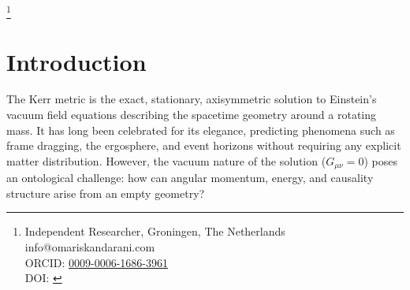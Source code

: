 \documentclass[twocolumn,aps,pre,floatfix,nofootinbib]{revtex4-2}
\begin{document}
    \title{\papertitle}
    \author{Omar Iskandarani}
    \thanks{Independent Researcher, Groningen, The Netherlands\\
    info@omariskandarani.com \\
    ORCID: \href{https://orcid.org/0009-0006-1686-3961}{0009-0006-1686-3961} \\
    DOI: \href{https://doi.org/\paperdoi}{\paperdoi}}
    \date{\today}

    \begin{abstract}
        \vspace*{-0.5em}
        \section*{\centering Abstract}
        \vspace*{-1em}

We reinterpret the Kerr solution of general relativity through the framework of the Vortex Æther Model (VAM), replacing spacetime curvature and singularities with structured swirl fields in an inviscid, incompressible medium. The Kerr frame-dragging term \(g_{t\phi}\) is shown to emerge naturally from the circulation \( \Gamma\) of an axisymmetric vortex ring, yielding a new expression: \(\g_{t\phi}^{(\text{VAM})} \sim -\frac{\Gamma}{C_e^2}\)

This correspondence allows us to model the rotating gravitational field of a compact object as a physical æther vortex with well-defined energy, swirl, and pressure gradients. We compare the VAM tensor formulation to the Einstein tensor of the Kerr metric and establish the conditions under which they produce similar observational effects. This work extends prior VAM formulations
 \cite{Iskandarani2025a,Iskandarani2025b,Iskandarani2025c,Iskandarani2025d,Iskandarani2025f}.

    \end{abstract}
    \maketitle


    \section{Introduction}

    The Kerr metric \cite{Kerr1963} is the exact, stationary, axisymmetric solution to Einstein's vacuum field equations describing the spacetime geometry around a rotating mass. It has long been celebrated for its elegance, predicting phenomena such as frame dragging, the ergosphere, and event horizons without requiring any explicit matter distribution. However, the vacuum nature of the solution ($G_{\mu\nu} = 0$) poses an ontological challenge: how can angular momentum, energy, and causality structure arise from an empty geometry?
\end{document}
